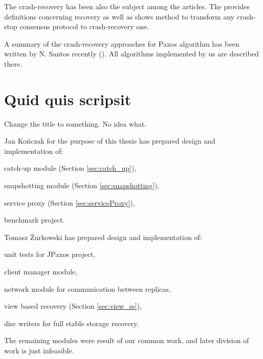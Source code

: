 The crash-recovery has been also the subject among the articles. The \cite{rodriguez2000atomic} provides definitions concerning recovery as well as shows method to transform any crash-stop consensus protocol to crash-recovery one.

A summary of the crash-recovery approaches for Paxos algorithm has been written by N. Santos recently (\cite{Nun10}). All algorithms implemented by us are described there.

\section{Quid quis scripsit}
\begin{TODO}Change the title to something. No idea what.\end{TODO}

Jan Kończak for the purpose of this thesis has prepared design and implementation of:
\begin{tightList}[\setlength{\leftmargin}{2\leftmargin}]
  \item[\textbullet] catch-up module (Section \ref{sec:catch_up}),
  \item[\textbullet] snapshotting module (Section \ref{sec:snapshotting}),
  \item[\textbullet] service proxy  (Section \ref{sec:serviceProxy}),
  \item[\textbullet] benchmark project.
\end{tightList}

Tomasz Żurkowski has prepared design and implementation of:
\begin{tightList}[\setlength{\leftmargin}{2\leftmargin}]
  \item[\textbullet] unit tests for JPaxos project,
  \item[\textbullet] client manager module, 
  \item[\textbullet] network module for communication between replicas,
  \item[\textbullet] view based recovery (Section \ref{sec:view_ss}),
  \item[\textbullet] disc writers for full stable storage recovery.
\end{tightList}

The remaining modules were result of our common work, and later division of work is just infeasible.

